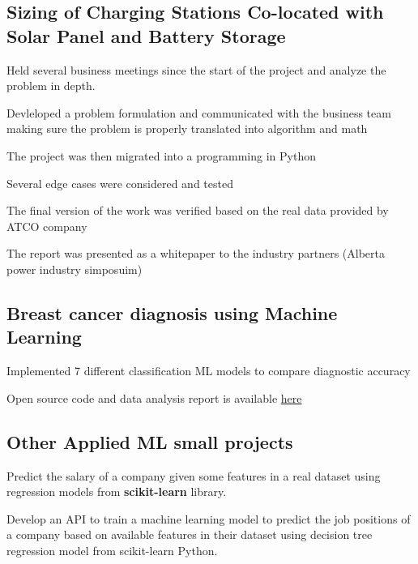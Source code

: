 \documentclass[letter,11pt]{article}
\begin{document}
	\subsection{Sizing of Charging Stations Co-located with Solar Panel and Battery Storage}
\begin{zitemize}
	\item Held several business meetings since the start of the project and analyze the problem in depth.
	\item Devleloped a problem formulation and communicated with the business team making sure the problem is properly translated into algorithm and math
	\item The project was then migrated into a programming in Python
	\item Several edge cases were considered and tested
	\item The final version of the work was verified based on the real data provided by ATCO company
	\item The report was presented as a whitepaper to the industry partners (Alberta power industry simposuim)
\end{zitemize}


\subsection{Breast cancer diagnosis using Machine Learning}
\begin{zitemize}
	\item Implemented 7 different classification ML models to compare diagnostic accuracy
	\item Open source code and data analysis report is available \href{https://github.com/Hadi2525/applied_ML/blob/master/Breast_cancer_ML/BC_ML.py}{here}
\end{zitemize}	
\subsection{Other Applied ML small projects}
\begin{zitemize}
	\item Predict the salary of a company given some features in a real dataset using regression models from \textbf{scikit-learn} library.
	\item Develop an API to train a machine learning model to predict the job positions of a company based on available features in their dataset using decision tree regression model from scikit-learn Python.
\end{zitemize}
\end{document}
